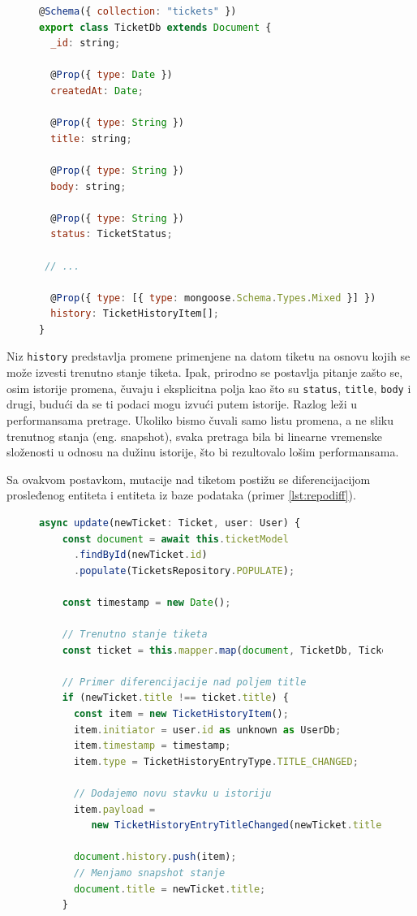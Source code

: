 \documentclass[12pt,oneside]{memoir}
\begin{document}
\begin{figure}[h]
\begin{lstlisting}[language=JavaScript, style=ES6, caption={Definicija sheme tiketa.}, label={lst:ticketschema}]
@Schema({ collection: "tickets" })
export class TicketDb extends Document {
  _id: string;

  @Prop({ type: Date })
  createdAt: Date;

  @Prop({ type: String })
  title: string;

  @Prop({ type: String })
  body: string;

  @Prop({ type: String })
  status: TicketStatus;

 // ...

  @Prop({ type: [{ type: mongoose.Schema.Types.Mixed }] })
  history: TicketHistoryItem[];
}
\end{lstlisting}
\end{figure}


\newpage
Niz \verb|history| predstavlja promene primenjene na datom tiketu na osnovu kojih se može izvesti trenutno stanje tiketa. Ipak, prirodno se postavlja pitanje zašto se, osim istorije promena, čuvaju i eksplicitna polja kao što su \verb|status|, \verb|title|, \verb|body| i drugi, budući da se ti podaci mogu izvući putem istorije. Razlog leži u performansama pretrage. Ukoliko bismo čuvali samo listu promena, a ne sliku trenutnog stanja (eng. snapshot), svaka pretraga bila bi linearne vremenske složenosti u odnosu na dužinu istorije, što bi rezultovalo lošim performansama.

Sa ovakvom postavkom, mutacije nad tiketom postižu se diferencijacijom prosleđenog entiteta i entiteta iz baze podataka (primer \ref{lst:repodiff}).

\begin{figure}[h]
\begin{lstlisting}[language=JavaScript, style=ES6, caption={Fajl \textit{ticket.repository.ts}}, label={lst:repodiff}]
  async update(newTicket: Ticket, user: User) {
    const document = await this.ticketModel
      .findById(newTicket.id)
      .populate(TicketsRepository.POPULATE); 

    const timestamp = new Date();

    // Trenutno stanje tiketa
    const ticket = this.mapper.map(document, TicketDb, Ticket);

    // Primer diferencijacije nad poljem title
    if (newTicket.title !== ticket.title) {
      const item = new TicketHistoryItem();
      item.initiator = user.id as unknown as UserDb;
      item.timestamp = timestamp;
      item.type = TicketHistoryEntryType.TITLE_CHANGED;

      // Dodajemo novu stavku u istoriju
      item.payload = 
         new TicketHistoryEntryTitleChanged(newTicket.title);
         
      document.history.push(item);
      // Menjamo snapshot stanje
      document.title = newTicket.title;
    }
\end{lstlisting}
\end{figure}
\end{document}
